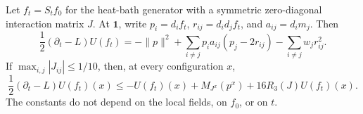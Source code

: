 \begin{lemma}
\label{rcut:lem:gradient-algebra}
Let $f_t=S_tf_0$ for the heat-bath generator with a symmetric
zero-diagonal interaction matrix $J$.  At $\mathbf 1$, write
$p_i=d_if_t$, $r_{ij}=d_id_jf_t$, and $a_{ij}=d_im_j$.
Then
\begin{equation}
 \frac12(\partial_t-L)U(f_t)
 =-\|p\|^2
   +\sum_{i\ne j}p_i a_{ij}(p_j-2r_{ij})
   -\sum_{i\ne j}w_jr_{ij}^2.
\label{rcut:eq:gradient-identity}
\end{equation}
If $\max_{i,j}|J_{ij}|\le1/10$, then, at every configuration $x$,
\begin{equation}
 \frac12(\partial_t-L)U(f_t)(x)
 \le -U(f_t)(x)+M_{J^x}(p^x)
             +16R_3(J)U(f_t)(x).
\label{rcut:eq:gradient-local-bound}
\end{equation}
The constants do not depend on the local fields, on $f_0$, or on $t$.
\end{lemma}

